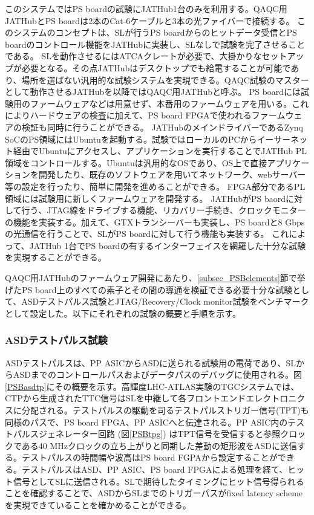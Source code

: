 このシステムではPS boardの試験にJATHub1台のみを利用する。QAQC用JATHubとPS boardは2本のCat-6ケーブルと3本の光ファイバーで接続する。
このシステムのコンセプトは、SLが行うPS boardからのヒットデータ受信とPS boardのコントロール機能をJATHubに実装し、SLなしで試験を完了させることである。
SLを動作させるにはATCAクレートが必要で、大掛かりなセットアップが必要となる。その点JATHubはデスクトップでも給電することが可能であり、場所を選ばない汎用的な試験システムを実現できる。QAQC試験のマスターとして動作させるJATHubを以降ではQAQC用JATHubと呼ぶ。
PS boardには試験用のファームウェアなどは用意せず、本番用のファームウェアを用いる。これによりハードウェアの検査に加えて、PS board FPGAで使われるファームウェアの検証も同時に行うことができる。
JATHubのメインドライバーであるZynq SoCのPS領域にはUbuntuを起動する。試験ではローカルのPCからイーサーネット経由でUbuntuにアクセスし、アプリケーションを実行することでJATHub PL領域をコントロールする。Ubuntuは汎用的なOSであり、OS上で直接アプリケーションを開発したり、既存のソフトウェアを用いてネットワーク、webサーバー等の設定を行ったり、簡単に開発を進めることができる。
FPGA部分であるPL領域には試験用に新しくファームウェアを開発する。
JATHubがPS baordに対して行う、JTAG線をドライブする機能、リカバリー手続き、クロックモニターの機能を実装する。加えて、GTXトランシーバーも実装し、PS boardと8 Gbpsの光通信を行うことで、SLがPS boardに対して行う機能も実装する。
これによって、JATHub 1台でPS boardの有するインターフェイスを網羅した十分な試験を実現することができる。

QAQC用JATHubのファームウェア開発にあたり、\ref{subsec_PSBelements}節で挙げたPS board上のすべての素子とその間の導通を検証できる必要十分な試験として、ASDテストパルス試験とJTAG/Recovery/Clock monitor試験をベンチマークとして設定した。以下にそれぞれの試験の概要と手順を示す。

\subsubsection{ASDテストパルス試験}
\label{subsubsec_testpulse}
\baselineskip

ASDテストパルスは、PP ASICからASDに送られる試験用の電荷であり、SLからASDまでのコントロールパスおよびデータパスのデバッグに使用される。図\ref{PSBasdtp}にその概要を示す。高輝度LHC-ATLAS実験のTGCシステムでは、CTPから生成されたTTC信号はSLを中継して各フロントエンドエレクトロニクスに分配される。テストパルスの駆動を司るテストパルストリガー信号(TPT)も同様のパスで、PS board FPGA、PP ASICへと伝達される。PP ASIC内のテストパルスジェネレーター回路 (図\ref{PSBtpg}) はTPT信号を受信すると参照クロックである40 MHzクロックの立ち上がりと同期した差動の矩形波をASDに送信する。テストパルスの時間幅や波高はPS board FGPAから設定することができる。テストパルスはASD、PP ASIC、PS board FPGAによる処理を経て、ヒット信号としてSLに送信される。SLで期待したタイミングにヒット信号得られることを確認することで、ASDからSLまでのトリガーパスがfixed latency schemeを実現できていることを確かめることができる。
\baselineskip

